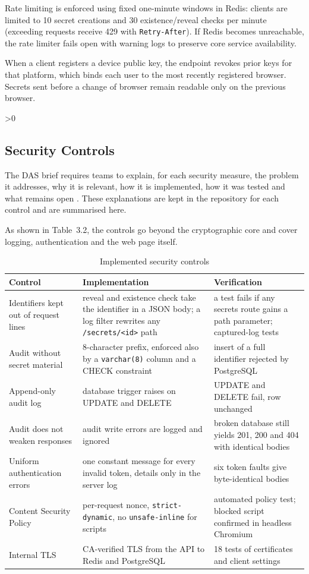 \documentclass[12pt,a4paper]{article}
\numberwithin{equation}{section}
\numberwithin{figure}{section}
\numberwithin{table}{section}
\newcommand{\subsec}[1]{%
  \ifnum\value{subsection}>0\clearpage\fi
  \subsection{#1}%
}
\newcommand{\tablesetup}{\fontsize{11pt}{13pt}\selectfont\singlespacing\renewcommand{\arraystretch}{1.15}}
\newcommand{\leadin}[1]{%
  {\onehalfspacing\setlength{\parindent}{1.25cm}\indent #1\par}\vspace{8pt}}
\begin{document}
Rate limiting is enforced using fixed one-minute windows in Redis: clients are limited to 10 secret creations and 30 existence/reveal checks per minute (exceeding requests receive 429 with \texttt{Retry-After}). If Redis becomes unreachable, the rate limiter fails open with warning logs to preserve core service availability.

When a client registers a device public key, the endpoint revokes prior keys for that platform, which binds each user to the most recently registered browser. Secrets sent before a change of browser remain readable only on the previous browser.

\subsec{Security Controls}

The DAS brief requires teams to explain, for each security measure, the problem it addresses, why it is relevant, how it is implemented, how it was tested and what remains open \cite{dasbrief}. These explanations are kept in the repository for each control \cite{secretsharerepo} and are summarised here.

\begin{table}[H]
\leadin{As shown in Table~3.2, the controls go beyond the cryptographic core and cover logging, authentication and the web page itself.}
\tablesetup
\caption{Implemented security controls}
\label{tab:controls}
\begin{tabularx}{\textwidth}{|P{0.19\textwidth}|L|P{0.29\textwidth}|}
\hline
\textbf{Control} & \textbf{Implementation} & \textbf{Verification} \\ \hline
Identifiers kept out of request lines & reveal and existence check take the identifier in a JSON body; a log filter rewrites any \texttt{/secrets/<id>} path & a test fails if any secrets route gains a path parameter; captured-log tests \\ \hline
Audit without secret material & 8-character prefix, enforced also by a \texttt{varchar(8)} column and a CHECK constraint & insert of a full identifier rejected by PostgreSQL \\ \hline
Append-only audit log & database trigger raises on UPDATE and DELETE & UPDATE and DELETE fail, row unchanged \\ \hline
Audit does not weaken responses & audit write errors are logged and ignored & broken database still yields 201, 200 and 404 with identical bodies \\ \hline
Uniform authentication errors & one constant message for every invalid token, details only in the server log & six token faults give byte-identical bodies \\ \hline
Content Security Policy & per-request nonce, \texttt{strict-dynamic}, no \texttt{unsafe-inline} for scripts & automated policy test; blocked script confirmed in headless Chromium \\ \hline
Internal TLS & CA-verified TLS from the API to Redis and PostgreSQL & 18 tests of certificates and client settings \\ \hline
\end{tabularx}
\end{table}
\end{document}
